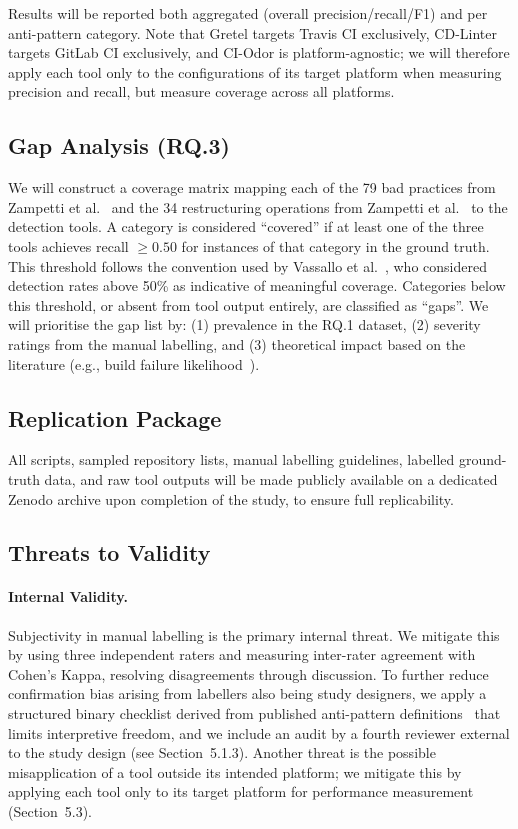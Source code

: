 \documentclass[12pt, a4paper]{article}
\begin{document}
Results will be reported both aggregated (overall precision/recall/F1) and per
anti-pattern category. Note that Gretel targets Travis CI exclusively, CD-Linter
targets GitLab CI exclusively, and CI-Odor is platform-agnostic; we will therefore
apply each tool only to the configurations of its target platform when measuring
precision and recall, but measure coverage across all platforms.

\subsection{Gap Analysis (RQ.3)}

We will construct a coverage matrix mapping each of the 79 bad practices from Zampetti
et al.~\cite{zampetti2020} and the 34 restructuring operations from Zampetti et
al.~\cite{zampetti2021} to the detection tools. A category is considered ``covered''
if at least one of the three tools achieves recall $\geq 0.50$ for instances of that
category in the ground truth. This threshold follows the convention used by Vassallo
et al.~\cite{vassallo2020b}, who considered detection rates above 50\% as indicative
of meaningful coverage. Categories below this threshold, or absent from tool output
entirely, are classified as ``gaps''. We will prioritise the gap list by: (1)
prevalence in the RQ.1 dataset, (2) severity ratings from the manual labelling, and
(3) theoretical impact based on the literature (e.g., build failure
likelihood~\cite{rausch2017, vassallo2017}).

\subsection{Replication Package}

All scripts, sampled repository lists, manual labelling guidelines, labelled
ground-truth data, and raw tool outputs will be made publicly available on a dedicated
Zenodo archive upon completion of the study, to ensure full replicability.

\subsection{Threats to Validity}

\paragraph{Internal Validity.}
Subjectivity in manual labelling is the primary internal threat. We mitigate this by
using three independent raters and measuring inter-rater agreement with Cohen's Kappa,
resolving disagreements through discussion. To further reduce confirmation bias
arising from labellers also being study designers, we apply a structured binary
checklist derived from published anti-pattern definitions~\cite{gallaba2020, vassallo2020b, zampetti2020}
that limits interpretive freedom, and we include an audit by a fourth reviewer
external to the study design (see Section~5.1.3). Another threat is the possible
misapplication of a tool outside its intended platform; we mitigate this by applying
each tool only to its target platform for performance measurement (Section~5.3).
\end{document}
